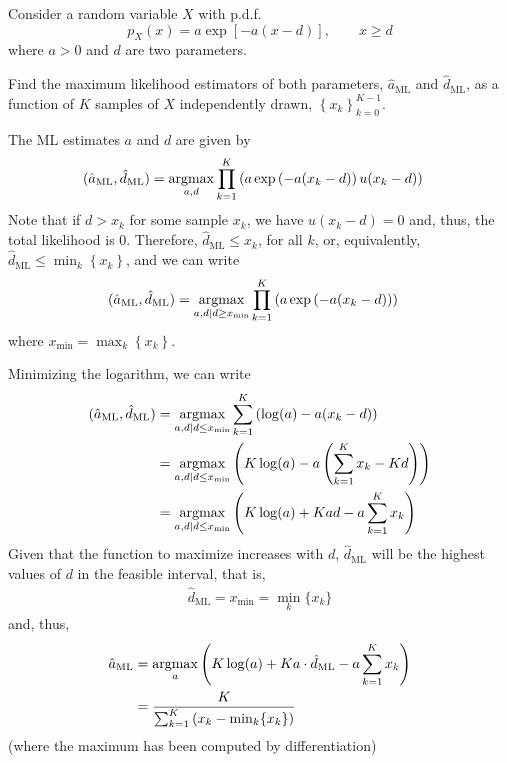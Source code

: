 \else

\question Consider a random variable $X$ with p.d.f.
$$p_X(x) = a\exp\left[-a(x-d)\right],  \qquad x \ge d$$
where $a>0$ and $d$ are two parameters.

Find the maximum likelihood estimators of both parameters, $\hat{a}_\text{ML}$ and $\hat{d}_\text{ML}$, as a function of $K$ samples of $X$ independently drawn, $\left\{x_k\right\}^{K-1}_{k=0}$.

\begin{solution}
The ML estimates $a$ and $d$ are given by
\begin{align*}
(\hat{a}_\text{ML}, \hat{d}_\text{ML}) 
	&= \operatorname*{argmax}_{a, d} \prod_{k=1}^{K} \left(a\exp\left(-a(x_k-d) \right) u(x_k - d)\right)
\end{align*}
Note that if $d > x_k$ for some sample $x_k$, we have $u(x_k - d)=0$ and, thus, the total likelihood is 0. Therefore, $\hat{d}_\text{ML} \le x_k$, for all $k$, or, equivalently, $\hat{d}_\text{ML} \le \min_k \left\{x_k\right\}$, and we can write
\begin{align*}
(\hat{a}_\text{ML}, \hat{d}_\text{ML}) 
	&= \operatorname*{argmax}_{a, d \mid d \ge x_{\min} } 
	       \prod_{k=1}^{K} \left(a\exp\left(-a(x_k-d) \right)\right)
\end{align*}
where $x_{\min} = \max_k \left\{x_k\right\}$. 

Minimizing the logarithm, we can write
\begin{align*}
(\hat{a}_\text{ML}, \hat{d}_\text{ML}) 
	&= \operatorname*{argmax}_{a, d \mid d \le x_{\min}}
	       \sum_{k=1}^{K} \left(\log(a) -a (x_k-d) \right) \\
	&= \operatorname*{argmax}_{a, d \mid d \le x_{\min}} 
	       \left(K\log(a) -a \left(\sum_{k=1}^{K} x_k- Kd\right) \right) \\
	&= \operatorname*{argmax}_{a, d \mid d \le x_{\min}} 
	       \left(K\log(a) + Kad - a \sum_{k=1}^{K} x_k \right)
\end{align*}
Given that the function to maximize increases with $d$, $\hat{d}_\text{ML}$ will be the highest values of $d$ in the feasible interval, that is,
\begin{align*}
\hat{d}_\text{ML} = x_{\min} = \min_{k}\{x_k\}
\end{align*}
and, thus,
\begin{align*}
\hat{a}_\text{ML} 
	&= \operatorname*{argmax}_{a} \left(K\log(a) + Ka\cdot \hat{d}_\text{ML} - a \sum_{k=1}^{K} x_k \right) \\
	&= \frac{K}{\sum^{K}_{k=1} \left(x_k-\min_k\{x_k\} \right)}	
\end{align*}
(where the maximum has been computed by differentiation)
\end{solution}

\fi